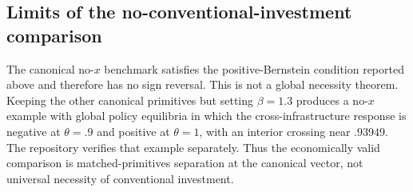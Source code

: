 \subsection{Limits of the no-conventional-investment comparison}

The canonical no-$x$ benchmark satisfies the positive-Bernstein condition reported above and therefore has no sign reversal. This is not a global necessity theorem. Keeping the other canonical primitives but setting $\beta=1.3$ produces a no-$x$ example with global policy equilibria in which the cross-infrastructure response is negative at $\theta=.9$ and positive at $\theta=1$, with an interior crossing near $.93949$. The repository verifies that example separately. Thus the economically valid comparison is matched-primitives separation at the canonical vector, not universal necessity of conventional investment.